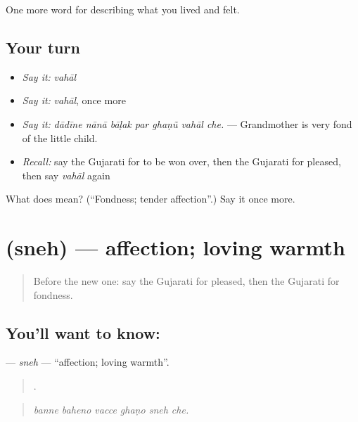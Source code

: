 \begin{grammarlens}[title={What you've built}]
One more word for describing what you lived and felt.
\end{grammarlens}

\subsection*{Your turn}
\begin{itemize}
\raggedright
  \item \emph{Say it:} \emph{vahāl}
  \item \emph{Say it:} \emph{vahāl}, once more
  \item \emph{Say it:} \emph{dādīne nānā bāḷak par ghaṇũ vahāl che.} — Grandmother is very fond of the little child.
  \item \emph{Recall:} say the Gujarati for to be won over, then the Gujarati for pleased, then say \emph{vahāl} again
\end{itemize}

\begin{tcolorbox}[breakable,colback=teal!4,colframe=teal!35!black,title={Before you move on}]
What does  mean? (\textquotedblleft{}Fondness; tender affection\textquotedblright{}.) Say it once more.
\end{tcolorbox}
\section[\texorpdfstring{\gu{સ્નેહ} (sneh)}{સ્નેહ (sneh)}]{ (sneh) — affection; loving warmth}

\label{lesson:GU-C450-sneh}



\begin{quote}
Before the new one: say the Gujarati for pleased, then the Gujarati for fondness.
\end{quote}

\subsection*{You'll want to know: }
\textbf{} — \emph{sneh} — \textquotedblleft{}affection; loving warmth\textquotedblright{}.

\begin{quote}
     .
\end{quote}

\begin{quote}
\emph{banne baheno vacce ghaṇo sneh che.}
\end{quote}

